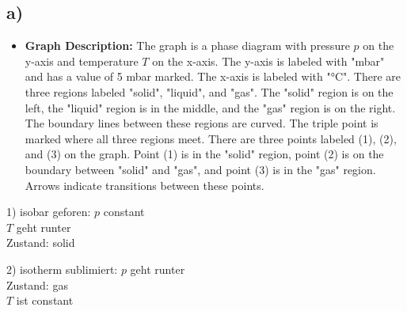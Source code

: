 

\subsection*{a)}

\begin{itemize}
    \item \textbf{Graph Description:} The graph is a phase diagram with pressure \( p \) on the y-axis and temperature \( T \) on the x-axis. The y-axis is labeled with "mbar" and has a value of 5 mbar marked. The x-axis is labeled with "°C". There are three regions labeled "solid", "liquid", and "gas". The "solid" region is on the left, the "liquid" region is in the middle, and the "gas" region is on the right. The boundary lines between these regions are curved. The triple point is marked where all three regions meet. There are three points labeled (1), (2), and (3) on the graph. Point (1) is in the "solid" region, point (2) is on the boundary between "solid" and "gas", and point (3) is in the "gas" region. Arrows indicate transitions between these points.
\end{itemize}

1) isobar geforen: \( p \) constant \\
   \( T \) geht runter \\
   Zustand: solid

2) isotherm sublimiert: \( p \) geht runter \\
   Zustand: gas \\
   \( T \) ist constant
